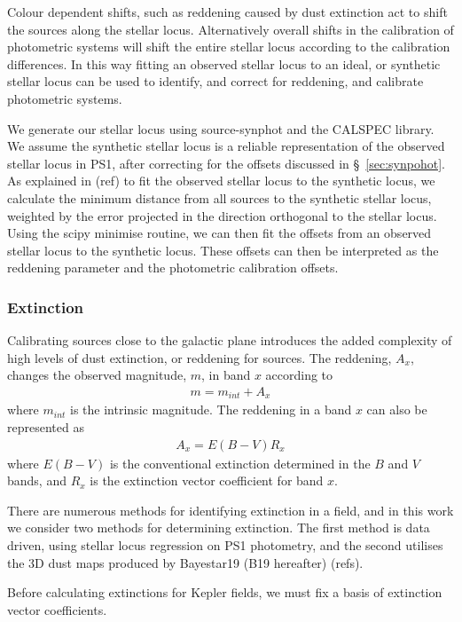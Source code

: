 \documentclass{aastex63}
\begin{document}
Colour dependent shifts, such as reddening caused by dust extinction act to shift the sources along the stellar locus. Alternatively overall shifts in the calibration of photometric systems will shift the entire stellar locus according to the calibration differences. In this way fitting an observed stellar locus to an ideal, or synthetic stellar locus can be used to identify, and correct for reddening, and calibrate photometric systems. 

We generate our stellar locus using source-synphot and the CALSPEC library. We assume the synthetic stellar locus is a reliable representation of the observed stellar locus in PS1, after correcting for the offsets discussed in \S~\ref{sec:synpohot}. As explained in (ref) to fit the observed stellar locus to the synthetic locus, we calculate the minimum distance from all sources to the synthetic stellar locus, weighted by the error projected in the direction orthogonal to the stellar locus. Using the scipy minimise routine, we can then fit the offsets from an observed stellar locus to the synthetic locus. These offsets can then be interpreted as the reddening parameter and the photometric calibration offsets.


\subsubsection{Extinction}
Calibrating sources close to the galactic plane introduces the added complexity of high levels of dust extinction, or reddening for sources. The reddening, $A_x$, changes the observed magnitude, $m$, in band $x$ according to
\begin{eqnarray}
m = m_{int} + A_x
\end{eqnarray}
where $m_{int}$ is the intrinsic magnitude. The reddening in a band $x$ can also be represented as
\begin{eqnarray}
A_x = E(B-V)R_x
\end{eqnarray}
where $E(B-V)$ is the conventional extinction determined in the $B$ and $V$ bands, and $R_x$ is the extinction vector coefficient for band $x$.

There are numerous methods for identifying extinction in a field, and in this work we consider two methods for determining extinction. The first method is data driven, using stellar locus regression on PS1 photometry, and the second utilises the 3D dust maps produced by Bayestar19 (B19 hereafter) (refs). 

Before calculating extinctions for Kepler fields, we must fix a basis of extinction vector coefficients. 
\end{document}
